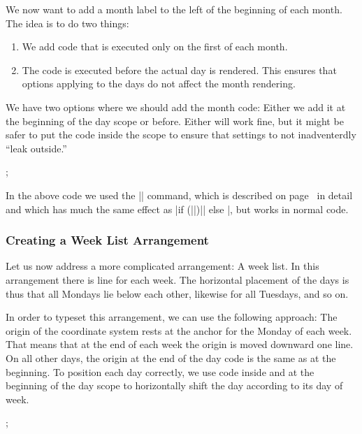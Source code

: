 We now want to add a month label to the left of the beginning of each
month. The idea is to do two things:
\begin{enumerate}
\item We add code that is executed only on the first of each month.
\item The code is executed before the actual day is rendered. This
  ensures that options applying to the days do not affect the month
  rendering.
\end{enumerate}
We have two options where we should add the month code: Either we add
it at the beginning of the day scope or before. Either will work fine,
but it might be safer to put the code inside the scope to ensure that
settings to not inadventerdly ``leak outside.''
\begin{codeexample}[]
\tikz
  \calendar
    [dates=2000-01-01 to 2000-01-08,
     execute after day scope={\pgftransformyshift{-1em}},
     execute at begin day scope=
       {\ifdate{day of month=1}{\tikzmonthcode}{}},
     every month/.append style={anchor=base east,xshift=-2em}];
\end{codeexample}

In the above code we used the |\ifdate| command, which is described on
page~\pageref{ifdate} in detail and which has much the same effect as
|if (||)|| else |, but
works in normal code.


\subsubsection{Creating a Week List Arrangement}

Let us now address a more complicated arrangement: A week list. In
this arrangement there is line for each week. The horizontal placement
of the days is thus that all Mondays lie below each other, likewise
for all Tuesdays, and so on.

In order to typeset this arrangement, we can use the following
approach: The origin of the coordinate system rests at the anchor for
the Monday of each week. That means that at the end of each week the
origin is moved downward one line. On all other days, the origin at
the end of the day code is the same as at the beginning. To position
each day correctly, we use code inside and at the beginning of the day
scope to horizontally shift the day according to its day of week. 
\begin{codeexample}[]
\tikz
  \calendar
    [dates=2000-01-01 to 2000-01-20,
     execute at begin day scope=
       {\pgftransformxshift{\pgfcalendarcurrentweekday em}},
     execute after day scope=
       {\ifdate{Sunday}{\pgftransformyshift{-1em}}{}}];
\end{codeexample}


